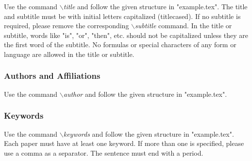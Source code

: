 \documentclass[a4paper,twoside]{article}
\begin{document}
Use the command \textit{$\backslash$title} and follow the given structure in "example.tex". The title and subtitle must be with initial letters
capitalized (titlecased). If no subtitle is required, please remove the corresponding \textit{$\backslash$subtitle} command. In the title or subtitle, words like "is", "or", "then", etc. should not be capitalized unless they are the first word of the subtitle. No formulas or special characters of any form or language are allowed in the title or subtitle.

\subsubsection{Authors and Affiliations}

Use the command \textit{$\backslash$author} and follow the given structure in "example.tex".

\subsubsection{Keywords}

Use the command \textit{$\backslash$keywords} and follow the given structure in "example.tex". Each paper must have at least one keyword. If more than one is specified, please use a comma as a separator. The sentence must end with a period.



\vfill


\end{document}
